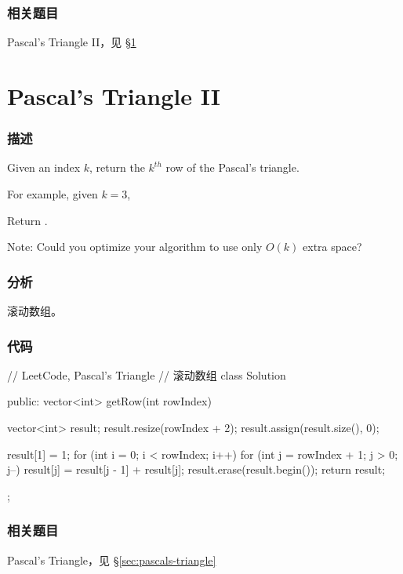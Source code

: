 \subsubsection{相关题目}
\begindot
\item Pascal's Triangle II，见 \S \ref{sec:pascals-triangle-ii}
\myenddot


\section{Pascal's Triangle II} %
\label{sec:pascals-triangle-ii}


\subsubsection{描述}
Given an index $k$, return the $k^{th}$ row of the Pascal's triangle.

For example, given $k = 3$,

Return \code{[1,3,3,1]}.

Note: Could you optimize your algorithm to use only $O(k)$ extra space?


\subsubsection{分析}
滚动数组。


\subsubsection{代码}

\begin{Code}
// LeetCode, Pascal's Triangle
// 滚动数组
class Solution {
public:
    vector<int> getRow(int rowIndex) {
        vector<int> result;
        result.resize(rowIndex + 2);
        result.assign(result.size(), 0);

        result[1] = 1;
        for (int i = 0; i < rowIndex; i++) {
            for (int j = rowIndex + 1; j > 0; j--) {
                result[j] = result[j - 1] + result[j];
            }
        }
        result.erase(result.begin());
        return result;
    }
};
\end{Code}


\subsubsection{相关题目}
\begindot
\item Pascal's Triangle，见 \S \ref{sec:pascals-triangle}
\myenddot


